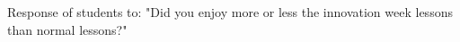 \label{fig:enjoy} Response of students to: "Did you enjoy more or less the innovation week lessons than normal lessons?"